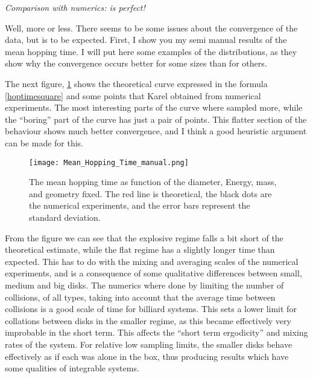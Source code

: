 \documentclass[letterpaper,12pt]{amsart}
\begin{document}
\emph{Comparison with numerics: is perfect!}

Well, more or less. There seems to be some issues about the convergence of the
data, but is to be expected. First, I show you my semi manual results of
the mean hopping time. I will put here some examples of the
distributions, as they show why the convergence occurs better for some
sizes than for others.

The next figure, \ref{MeanHopp01} shows the theoretical curve 
expressed in the formula \ref{hoptimesquare} and some points
that Karel obtained from numerical experiments. The most interesting
parts of the curve where sampled more, while the ``boring'' part
of the curve has just a pair of points. This flatter section of
the behaviour shows much better convergence, and I think a
good heuristic argument can be made for this.

\begin{figure}[h]
  \centering
  \texttt{[image: Mean\_Hopping\_Time\_manual.png]}
  \caption{The mean hopping time as function of the diameter, Energy, mass, and geometry fixed.
The red line is theoretical, the black dots are the numerical experiments, and the error bars
represent the standard deviation.}\label{MeanHopp01}
\end{figure}

From the figure we can see that the explosive regime falls a bit short of
the theoretical estimate, while  the flat regime has a slightly longer
time than expected. This has to do with the mixing and averaging scales
of the numerical experiments, and is a consequence of some
qualitative differences between small, medium and big disks. The numerics where done
by limiting the number of collisions, of all types, taking into account
that the average time between collisions is a good scale of time
for billiard systems. This sets a lower limit for collations between
disks in the smaller regime, as this became effectively very
improbable in the short term. This affects the ``short term ergodicity'' and
mixing rates of the system. For relative low sampling limits, the
smaller disks behave effectively as if each was alone in the box, thus
producing results which have some qualities of integrable systems. 
\end{document}
